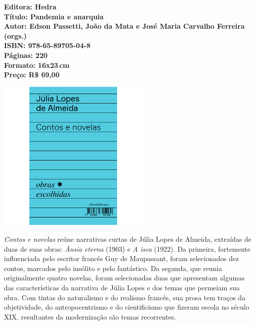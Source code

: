 \vfill
\noindent\begin{minipage}[c]{.5\linewidth}
{\small\textbf{
\hspace*{-.1cm}Editora: Hedra\\
Título: Pandemia e anarquia\\
Autor: Edson Passetti, João da Mata e José Maria Carvalho Ferreira (orgs.)\\ 
ISBN: 978-65-89705-04-8\\
Páginas: 220\\
Formato: 16x23\,cm\\
Preço: R\$ 69,00\\
}}
\end{minipage}
\pagebreak

\begin{center}
\hspace*{-3.6cm}
\hspace*{3.1cm}\includegraphics[width=74mm]{./CAPAS/HEDRA_JULIA.jpg}
\end{center}
\hspace*{-7cm}\hrulefill\hspace*{-7cm}
\medskip

\noindent{}\textit{Contos e novelas} reúne narrativas curtas de Júlia Lopes de Almeida, extraídas de duas de suas obras: \textit{Ânsia eterna} (1903) e \textit{A isca} (1922). Da primeira, fortemente influenciada pelo escritor francês Guy de Maupassant, foram selecionados dez contos, marcados pelo insólito e pelo fantástico. Da segunda, que reunia originalmente quatro novelas, foram selecionadas duas que apresentam algumas das características da narrativa de Júlia Lopes e dos temas que permeiam sua obra. Com tintas do naturalismo e do realismo francês, sua prosa tem traços da objetividade, do antropocentrismo e do cientificismo que fizeram escola no século XIX.  resultantes da modernização são temas recorrentes.

